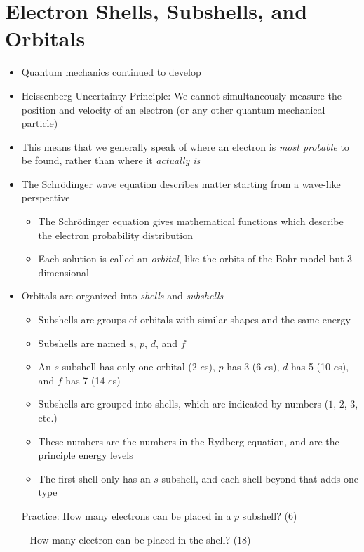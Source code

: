 \documentclass[12pt, openany, letterpaper]{memoir}
\begin{document}
\section{Electron Shells, Subshells, and Orbitals}
\begin{itemize}
	\item Quantum mechanics continued to develop
	\item Heissenberg Uncertainty Principle: We cannot simultaneously measure the position and velocity of an electron (or any other quantum mechanical particle)
	\item This means that we generally speak of where an electron is \emph{most probable} to be found, rather than where it \emph{actually is}
	\item The Schr\"odinger wave equation describes matter starting from a wave-like perspective
	      \begin{itemize}
		      \item The Schr\"odinger equation gives mathematical functions which describe the electron probability distribution
		      \item Each solution is called an \emph{orbital}, like the orbits of the Bohr model but 3-dimensional
	      \end{itemize}
	\item Orbitals are organized into \emph{shells} and \emph{subshells}
	      \begin{itemize}
		      \item Subshells are groups of orbitals with similar shapes and the same energy
		      \item Subshells are named $s$, $p$, $d$, and $f$
		      \item An $s$ subshell has only one orbital (2 $e$s), $p$ has 3 (6 $e$s), $d$ has 5 (10 $e$s), and $f$ has 7 (14 $e$s)
		      \item Subshells are grouped into shells, which are indicated by numbers ($1$, $2$, $3$, etc.)
		      \item These numbers are the numbers in the Rydberg equation, and are the principle energy levels
		      \item The first shell only has an $s$ subshell, and each shell beyond that adds one type
	      \end{itemize}
	      Practice: How many electrons can be placed in a $p$ subshell? ($6$)

	      ~\hphantom{Practice:} How many electron can be placed in the  shell? ($18$)


\end{itemize}
\end{document}
